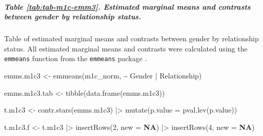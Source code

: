 \documentclass[
  bookmarksnumbered]{article}
\newenvironment{Shaded}{\begin{snugshade}}{\end{snugshade}}
\newcommand{\AttributeTok}[1]{\textcolor[rgb]{0.80,0.80,0.80}{#1}}
\newcommand{\ConstantTok}[1]{\textcolor[rgb]{0.86,0.64,0.64}{\textbf{#1}}}
\newcommand{\DecValTok}[1]{\textcolor[rgb]{0.86,0.86,0.80}{#1}}
\newcommand{\FunctionTok}[1]{\textcolor[rgb]{0.94,0.94,0.56}{#1}}
\newcommand{\NormalTok}[1]{\textcolor[rgb]{0.80,0.80,0.80}{#1}}
\newcommand{\OtherTok}[1]{\textcolor[rgb]{0.94,0.94,0.56}{#1}}
\newcommand{\SpecialCharTok}[1]{\textcolor[rgb]{0.86,0.64,0.64}{#1}}
\begin{document}
\subparagraph{Table \ref{tab:tab-m1c-emm3}. Estimated marginal means and contrasts between gender by relationship status.}\label{table-reftabtab-m1c-emm3.-estimated-marginal-means-and-contrasts-between-gender-by-relationship-status.}

Table of estimated marginal means and contrasts between gender by relationship status. All estimated marginal means and contrasts were calculated using the \texttt{emmeans} function from the \texttt{emmeans} package \autocite{emmeanscit}.

\begin{Shaded}
\begin{Highlighting}[]
\NormalTok{emms.m1c3 }\OtherTok{\textless{}{-}} \FunctionTok{emmeans}\NormalTok{(m1c\_norm, }\SpecialCharTok{\textasciitilde{}}\NormalTok{ Gender }\SpecialCharTok{|}\NormalTok{ Relationship)}

\NormalTok{emms.m1c3.tab }\OtherTok{\textless{}{-}} \FunctionTok{tibble}\NormalTok{(}\FunctionTok{data.frame}\NormalTok{(emms.m1c3))}

\NormalTok{t.m1c3 }\OtherTok{\textless{}{-}} \FunctionTok{contr.stars}\NormalTok{(emms.m1c3) }\SpecialCharTok{|\textgreater{}}
  \FunctionTok{mutate}\NormalTok{(}\AttributeTok{p.value =} \FunctionTok{pval.lev}\NormalTok{(p.value))}

\NormalTok{t.m1c3.f }\OtherTok{\textless{}{-}}\NormalTok{ t.m1c3 }\SpecialCharTok{|\textgreater{}}
  \FunctionTok{insertRows}\NormalTok{(}\DecValTok{2}\NormalTok{, }\AttributeTok{new =} \ConstantTok{NA}\NormalTok{) }\SpecialCharTok{|\textgreater{}}
  \FunctionTok{insertRows}\NormalTok{(}\DecValTok{4}\NormalTok{, }\AttributeTok{new =} \ConstantTok{NA}\NormalTok{)}


\end{Highlighting}
\end{Shaded}
\end{document}
